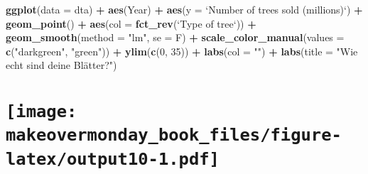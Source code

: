 \documentclass[]{book}
\newenvironment{Shaded}{\begin{snugshade}}{\end{snugshade}}
\newcommand{\KeywordTok}[1]{\textcolor[rgb]{0.13,0.29,0.53}{\textbf{#1}}}
\newcommand{\DataTypeTok}[1]{\textcolor[rgb]{0.13,0.29,0.53}{#1}}
\newcommand{\DecValTok}[1]{\textcolor[rgb]{0.00,0.00,0.81}{#1}}
\newcommand{\StringTok}[1]{\textcolor[rgb]{0.31,0.60,0.02}{#1}}
\newcommand{\OperatorTok}[1]{\textcolor[rgb]{0.81,0.36,0.00}{\textbf{#1}}}
\newcommand{\NormalTok}[1]{#1}
\theoremstyle{definition}
\theoremstyle{definition}
\theoremstyle{definition}
\theoremstyle{remark}
\begin{document}
\begin{Shaded}
\begin{Highlighting}[]
\KeywordTok{ggplot}\NormalTok{(}\DataTypeTok{data =}\NormalTok{ dta) }\OperatorTok{+}
\StringTok{  }\KeywordTok{aes}\NormalTok{(Year) }\OperatorTok{+}
\StringTok{  }\KeywordTok{aes}\NormalTok{(}\DataTypeTok{y =} \StringTok{`}\DataTypeTok{Number of trees sold (millions)}\StringTok{`}\NormalTok{) }\OperatorTok{+}
\StringTok{  }\KeywordTok{geom_point}\NormalTok{() }\OperatorTok{+}
\StringTok{  }\KeywordTok{aes}\NormalTok{(}\DataTypeTok{col =} \KeywordTok{fct_rev}\NormalTok{(}\StringTok{`}\DataTypeTok{Type of tree}\StringTok{`}\NormalTok{)) }\OperatorTok{+}
\StringTok{  }\KeywordTok{geom_smooth}\NormalTok{(}\DataTypeTok{method =} \StringTok{"lm"}\NormalTok{, }\DataTypeTok{se =}\NormalTok{ F) }\OperatorTok{+}
\StringTok{  }\KeywordTok{scale_color_manual}\NormalTok{(}\DataTypeTok{values =} \KeywordTok{c}\NormalTok{(}\StringTok{"darkgreen"}\NormalTok{, }\StringTok{"green"}\NormalTok{)) }\OperatorTok{+}
\StringTok{  }\KeywordTok{ylim}\NormalTok{(}\KeywordTok{c}\NormalTok{(}\DecValTok{0}\NormalTok{, }\DecValTok{35}\NormalTok{)) }\OperatorTok{+}
\StringTok{  }\KeywordTok{labs}\NormalTok{(}\DataTypeTok{col =} \StringTok{""}\NormalTok{) }\OperatorTok{+}
\StringTok{  }\KeywordTok{labs}\NormalTok{(}\DataTypeTok{title =} \StringTok{"Wie echt sind deine Blätter?"}\NormalTok{) }
\end{Highlighting}
\end{Shaded}

\section[]{\texorpdfstring{\protect\texttt{[image: makeovermonday\_book\_files/figure-latex/output10-1.pdf]}}{}}\label{section-19}

\clearpage
\end{document}
